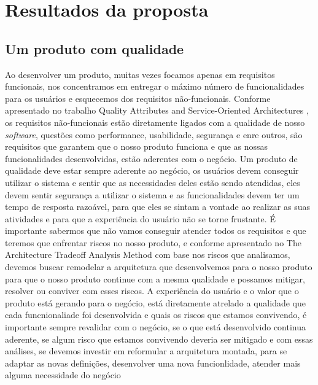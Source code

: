 \chapter{Resultados da proposta}

  \section{Um produto com qualidade}
  Ao desenvolver um produto, muitas vezes focamos apenas em requisitos
  funcionais, nos concentramos em entregar o máximo número de funcionalidades
  para os usuários e esquecemos dos requisitos não-funcionais. Conforme apresentado
  no trabalho Quality Attributes and Service-Oriented Architectures
  \cite{O'BrienQualityAttributes2005}, os requisitos não-funcionais estão diretamente
  ligados com a qualidade de nosso \textit{software}, questões como performance,
  usabilidade, segurança e enre outros, são requisitos que garantem que o nosso
  produto funciona e que as nossas funcionalidades desenvolvidas, estão aderentes
  com o negócio. \newline
  Um produto de qualidade deve estar sempre aderente ao negócio, os usuários devem
  conseguir utilizar o sistema e sentir que as necessidades deles estão sendo
  atendidas, eles devem sentir segurança a utilizar o sistema e as funcionalidades
  devem ter um tempo de resposta razoável, para que eles se sintam a vontade ao
  realizar as suas atividades e para que a experiência do usuário não se torne
  frustante. É importante sabermos que não vamos conseguir atender todos os
  requisitos e que teremos que enfrentar riscos no nosso produto, e conforme
  apresentado no The Architecture Tradeoff Analysis Method \cite{KazmanTheArchitecture1998}
  com base nos riscos que analisamos, devemos buscar remodelar a arquitetura que
  desenvolvemos para o nosso produto para que o nosso produto continue com a
  mesma qualidade e possamos mitigar, resolver ou conviver com esses riscos.
  A experiência do usuário e o valor que o produto está gerando para o negócio,
  está diretamente atrelado a qualidade que cada funcnionaliade foi desenvolvida
  e quais os riscos que estamos convivendo, é importante sempre revalidar com o
  negócio, se o que está desenvolvido continua aderente, se algum risco que
  estamos convivendo deveria ser mitigado e com essas análises, se devemos
  investir em reformular a arquitetura montada, para se adaptar as novas definições,
  desenvolver uma nova funcionlidade, atender mais alguma necessidade do negócio
